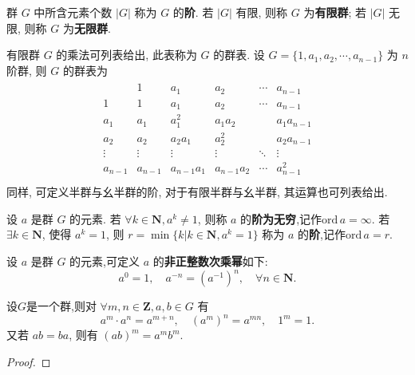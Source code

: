 \documentclass[../../main.tex]{subfiles}
\begin{document}
\begin{definition}
群 \( G \) 中所含元素个数 \( |G| \) 称为 \( G \) 的\textbf{阶}. 若 \( |G| \) 有限, 则称 \( G \) 为\textbf{有限群}; 若 \( |G| \) 无限, 则称 \( G \) 为\textbf{无限群}.
\end{definition}
\begin{remark}
有限群 \( G \) 的乘法可列表给出, 此表称为 \( G \) 的群表. 设 \( G = \{1, a_1, a_2, \cdots, a_{n-1}\} \) 为 \( n \) 阶群, 则 \( G \) 的群表为
\begin{align*}
\begin{array}{c|ccccc}
& 1 & a_1 & a_2 & \cdots & a_{n-1} \\
\hline
1 & 1 & a_1 & a_2 & \cdots & a_{n-1} \\
a_1 & a_1 & a_1^2 & a_1a_2 &  & a_1a_{n-1} \\
a_2 & a_2 & a_2a_1 & a_2^2 &  & a_2a_{n-1} \\
\vdots & \vdots & \vdots & \vdots & \ddots & \vdots \\
a_{n-1} & a_{n-1} & a_{n-1}a_1 & a_{n-1}a_2 & \cdots & a_{n-1}^2 \\
\end{array}
\end{align*}
同样, 可定义半群与幺半群的阶, 对于有限半群与幺半群, 其运算也可列表给出.
\end{remark}

\begin{definition}
设 \( a \) 是群 \( G \) 的元素. 若 \( \forall k \in \mathbf{N}, a^k \neq 1 \), 则称 \( a \) 的\textbf{阶为无穷},记作$\mathrm{ord}\,a=\infty $. 若 \( \exists k \in \mathbf{N} \), 使得 \( a^k = 1 \), 则 \( r=\min\{k|k \in \mathbf{N}, a^k = 1\} \) 称为 \( a \) 的\textbf{阶},记作$\mathrm{ord}\,a=r$.
\end{definition}

\begin{definition}
设 \( a \) 是群 \( G \) 的元素,可定义 \( a \) 的\textbf{非正整数次乘幂}如下:
\[
a^0 = 1, \quad a^{-n} = (a^{-1})^n, \quad \forall n \in \mathbf{N}.
\]
\end{definition}

\begin{theorem}
设$G$是一个群,则对 \( \forall m, n \in \mathbf{Z}, a, b \in G \) 有
\[
a^m \cdot a^n = a^{m+n}, \quad (a^m)^n = a^{mn}, \quad 1^m = 1.
\]
又若 \( ab = ba \), 则有 \( (ab)^m = a^m b^m \).
\end{theorem}
\begin{proof}


\end{proof}
\end{document}
